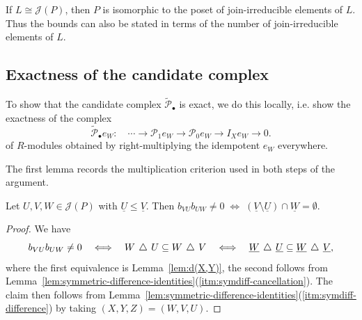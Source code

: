 \documentclass[a4paper,leqno]{amsart}
\begin{document}
\begin{rmk}
If $L\cong\mathcal J(P)$, then $P$ is isomorphic to the poset of join-irreducible elements of $L$. Thus the bounds can also be stated in terms of the number of join-irreducible elements of $L$.
\end{rmk}

\subsection{Exactness of the candidate complex}
To show that the candidate complex $\widetilde{\mathcal{P}}_\bullet$ is exact, we do this locally, i.e. show the exactness of the complex 
\begin{equation*}
 \widetilde{\mathcal P}_\bullet e_W:\quad
 \cdots\longrightarrow\mathcal P_1e_W
 \longrightarrow\mathcal P_0e_W
 \longrightarrow I_Xe_W\longrightarrow0.
\end{equation*}
of $R$-modules obtained by right-multiplying the idempotent $e_W$ everywhere.

The first lemma records the multiplication criterion used in both steps of the argument.

\begin{lem}\label{lem:multiplication-criterion}
Let $U,V,W\in\mathcal J(P)$ with $\underline{U}\leq \underline{V}$.  Then $b_{VU}b_{UW}\neq0 \; \Leftrightarrow\; (\underline{V}\setminus \underline{U})\cap \underline{W}=\emptyset$.
\end{lem}

\begin{proof}We have
\[
 b_{VU}b_{UW}\neq0
 \quad\Longleftrightarrow\quad W\,\mathbin{\triangle}\, U\subseteq W\,\mathbin{\triangle}\, V
 \quad\Longleftrightarrow\quad
 \underline{W}\,\mathbin{\triangle}\,\underline{U}\subseteq\underline{W}\,\mathbin{\triangle}\,\underline{V},
\]
where the first equivalence is Lemma~\ref{lem:d(X,Y)}, the second follows from Lemma~\ref{lem:symmetric-difference-identities}\textup{(\ref{itm:symdiff-cancellation})}. The claim then follows from Lemma~\ref{lem:symmetric-difference-identities}\textup{(\ref{itm:symdiff-difference})} by taking $(X,Y,Z)=(W,V,U)$.
\end{proof}
\end{document}
